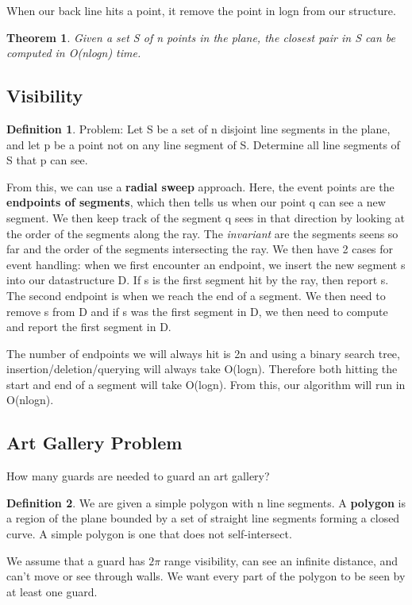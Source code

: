 \documentclass[11pt, oneside]{article}
\newtheorem{theorem}{Theorem}
\theoremstyle{definition}
\newtheorem{definition}{Definition}[section]
\begin{document}
When our back line hits a point, it remove the point in logn from our structure.
\begin{theorem}
  Given a set S of n points in the plane, the closest pair in S can be computed in O(nlogn) time.
  \end{theorem}

\subsection{Visibility}
\begin{definition}
  Problem: Let S be a set of n disjoint line segments in the plane, and let p be a point not on any line segment of S. Determine all line segments of S that p can see.
\end{definition}

From this, we can use a \textbf{radial sweep} approach. Here, the event points are the \textbf{endpoints of segments}, which then tells us when our point q can see a new segment. We then keep track of the segment q sees in that direction by looking at the order of the segments along the ray. The \textit{invariant} are the segments seens so far and the order of the segments intersecting the ray. We then have 2 cases for event handling: when we first encounter an endpoint, we insert the new segment s into our datastructure D. If s is the first segment hit by the ray, then report s. The second endpoint is when we reach the end of a segment. We then need to remove s from D and if s was the first segment in D, we then need to compute and report the first segment in D.

The number of endpoints we will always hit is 2n and using a binary search tree, insertion/deletion/querying will always take O(logn). Therefore both hitting the start and end of a segment will take O(logn). From this, our algorithm will run in O(nlogn).

\subsection{Art Gallery Problem}
How many guards are needed to guard an art gallery?
\begin{definition}
  We are given a simple polygon with n line segments. A \textbf{polygon} is a region of the plane bounded by a set of straight line segments forming a closed curve. A simple polygon is one that does not self-intersect.
\end{definition}

We assume that a guard has $2\pi$ range visibility, can see an infinite distance, and can't move or see through walls. We want every part of the polygon to be seen by at least one guard.
\end{document}
